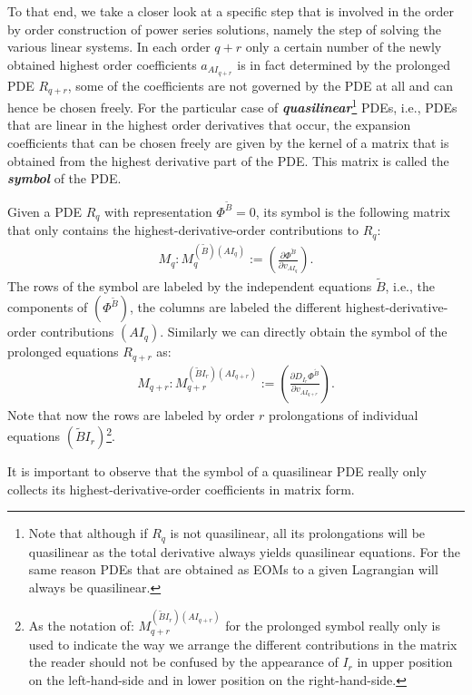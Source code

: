To that end, we take a closer look at a specific step that is involved in  the order by order construction of power series solutions, namely the step of solving the various linear systems.
In each order $q+r$ only a certain number of the newly obtained highest order coefficients $a_{AI_{q+r}}$ is in fact determined by the prolonged PDE $R_{q+r}$, some of the coefficients are not governed by the PDE at all and can hence be chosen freely.
For the particular case of \textit{\textbf{quasilinear}}\footnote{Note that although if $R_q$ is not quasilinear, all its prolongations will be quasilinear as the total derivative always yields quasilinear equations. For the same reason PDEs that are obtained as EOMs to a given Lagrangian will always be quasilinear.} PDEs, i.e., PDEs that are linear in the highest order derivatives that occur, the expansion coefficients that can be chosen freely are given by the kernel of a matrix that is obtained from the highest derivative part of the PDE. This matrix is called the \textit{\textbf{symbol}} of the PDE.
\begin{definition}[symbol]
Given a PDE $R_q$ with representation $\Phi^{\tilde{B}}=0$, its symbol is the following matrix that only contains the highest-derivative-order contributions to $R_q$:
\begin{align}
    M_q : M_q^{(\tilde{B})({AI_q})} := \left ( \frac{\partial \Phi^{\tilde{B}}}{\partial v_{AI_q}} \right ).
\end{align}
The rows of the symbol are labeled by the independent equations $\tilde{B}$, i.e., the components of $(\Phi^{\tilde{B}})$, the columns are labeled the different highest-derivative-order contributions $(AI_q)$.
Similarly we can directly obtain the symbol of the prolonged equations $R_{q+r}$ as:
\begin{align}\label{proSym}
    M_{q+r} : M_{q+r} ^{(\tilde{B}I_r) (AI_{q+r})}:= \left ( \frac{\partial D_{I_r}\Phi^{\tilde{B}
    }}{\partial v_{AI_{q+r}}} \right ). 
\end{align}
Note that now the rows are labeled by order $r$ prolongations of individual equations $(\tilde{B}I_r)$\footnote{As the notation of: $M_{q+r} ^{(\tilde{B}I_r) (AI_{q+r})}$ for the prolonged symbol really only is used to indicate the way we arrange the different contributions in the matrix the reader should not be confused by the appearance of $I_r$ in upper position on the left-hand-side and in lower position on the right-hand-side.}.
\end{definition}
It is important to observe that the symbol of a quasilinear PDE really only collects its highest-derivative-order coefficients in matrix form.
